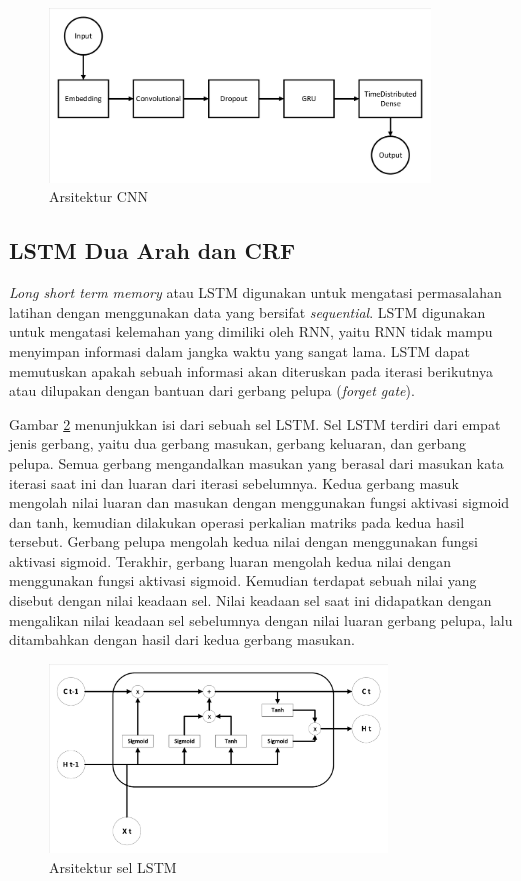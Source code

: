 \begin{figure}[H]
	\centering
	\includegraphics[width=0.9\textwidth, trim=2 2 2 2, clip]{resources/3/cnn.pdf}
	\caption{Arsitektur CNN \parencite{sasank2017spoken}}
	\label{fig:cnn}
\end{figure}

\subsection{LSTM Dua Arah dan CRF}

\textit{Long short term memory} atau LSTM digunakan untuk mengatasi permasalahan latihan dengan menggunakan data yang bersifat \textit{sequential}. LSTM digunakan untuk mengatasi kelemahan yang dimiliki oleh RNN, yaitu RNN tidak mampu menyimpan informasi dalam jangka waktu yang sangat lama. LSTM dapat memutuskan apakah sebuah informasi akan diteruskan pada iterasi berikutnya atau dilupakan dengan bantuan dari gerbang pelupa (\textit{forget gate}).

Gambar \ref{fig:lstm} menunjukkan isi dari sebuah sel LSTM. Sel LSTM terdiri dari empat jenis gerbang, yaitu dua gerbang masukan, gerbang keluaran, dan gerbang pelupa. Semua gerbang mengandalkan masukan yang berasal dari masukan kata iterasi saat ini dan luaran dari iterasi sebelumnya. Kedua gerbang masuk mengolah nilai luaran dan masukan dengan menggunakan fungsi aktivasi sigmoid dan tanh, kemudian dilakukan operasi perkalian matriks pada kedua hasil tersebut. Gerbang pelupa mengolah kedua nilai dengan menggunakan fungsi aktivasi sigmoid. Terakhir, gerbang luaran mengolah kedua nilai dengan menggunakan fungsi aktivasi sigmoid. Kemudian terdapat sebuah nilai yang disebut dengan nilai keadaan sel. Nilai keadaan sel saat ini didapatkan dengan mengalikan nilai keadaan sel sebelumnya dengan nilai luaran gerbang pelupa, lalu ditambahkan dengan hasil dari kedua gerbang masukan.

\begin{figure}[H]
	\centering
	\includegraphics[width=0.8\textwidth, trim=2 2 2 2, clip]{resources/3/lstm.pdf}
	\caption{Arsitektur sel LSTM}
	\label{fig:lstm}
\end{figure}

